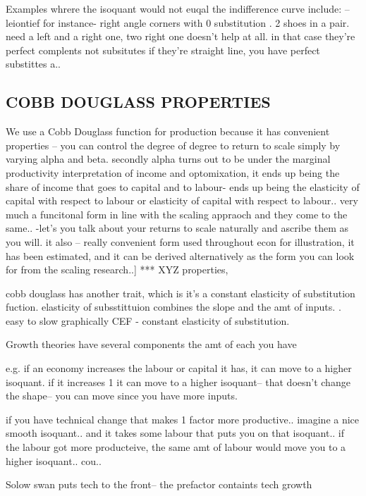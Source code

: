 Examples whrere the isoquant would not euqal the indifference curve include: -- leiontief for instance- right angle corners with 0 substitution . 2 shoes in a pair. need a left and a right one, two right one doesn't help at all. in that case they're perfect complents not subsitutes
if they're straight line, you have perfect substittes a.. 




\subsection{COBB DOUGLASS PROPERTIES}

We use a Cobb Douglass function for production because it has convenient properties -- you can control the degree of degree to return to scale simply by varying alpha and beta. secondly alpha turns out to be under the marginal productivity interpretation of income and optomixation, it ends up being the share of income that goes to capital and to labour- ends up being the elasticity of capital with respect to labour or elasticity of capital with respect to labour.. very much a funcitonal form in line with the scaling  appraoch and they come to the same.. -let's you talk about your returns to scale naturally and ascribe them as you will. it also -- really convenient form used throughout econ for illustration, it has been estimated, and it can be derived alternatively as the form you can look for from the scaling research..]
*** XYZ properties,

cobb douglass has another trait, which is it's a constant elasticity of substitution fuction.
elasticity of subsstittuion combines the slope and the amt of inputs. . easy to slow graphically CEF - constant elasticity of substitution.




Growth theories have several components
the amt of each you have

e.g. if an economy increases the labour or capital it has, it can move to a higher isoquant. if it increases 1 it can move to a higher isoquant-- that doesn't change the shape-- you can move since you have more inputs.

if you have technical change that makes 1 factor more productive.. imagine a nice smooth isoquant.. and it takes some labour that puts you on that isoquant.. if the labour got more producteive, the same amt of labour would move you to a higher isoquant.. cou..


Solow swan puts tech to the front-- the prefactor containts tech growth

